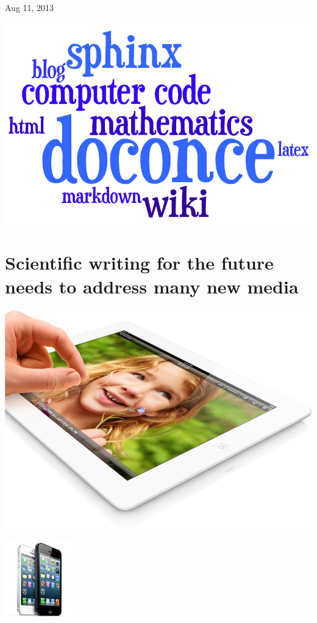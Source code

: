 \documentclass[%
oneside,                 %
final,                   %
chapterprefix=true,      %
open=right               %
10pt]{book}
\begin{document}
\vfill
\clearpage

\begin{center}
Aug 11, 2013
\end{center}

\vspace{1cm}



\begin{center}  %
  \centerline{\includegraphics[width=0.5\linewidth]{../doc/slides/fig/doconce1b.png}}
\end{center}


\section{Scientific writing for the future needs to address many new media}


\begin{center}  %
  \centerline{\includegraphics[width=0.8\linewidth]{../doc/slides/fig/ipad.png}}
\end{center}



\begin{center}  %
  \centerline{\includegraphics[width=0.3\linewidth]{../doc/slides/fig/iphones.jpg}}
\end{center}
\end{document}
